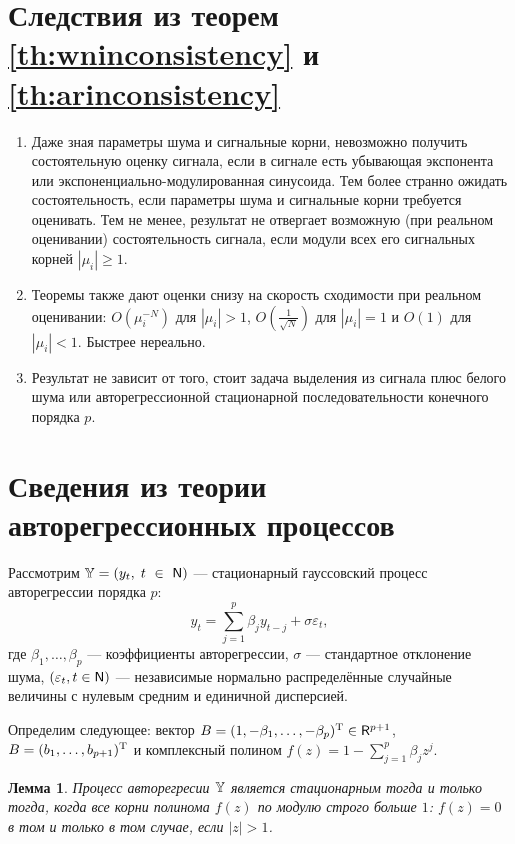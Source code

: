 \documentclass[12pt,a4paper]{article}
\newtheorem{lemma}{Лемма}
\begin{document}
\section{Следствия из теорем \ref{th:wninconsistency} и \ref{th:arinconsistency}}
\begin{enumerate}
	\item Даже зная параметры шума и сигнальные корни, невозможно получить состоятельную оценку сигнала, если в сигнале есть убывающая экспонента или экспоненциально-модулированная синусоида. Тем более странно ожидать состоятельность, если параметры шума и сигнальные корни требуется оценивать. Тем не менее, результат не отвергает возможную (при реальном оценивании) состоятельность сигнала, если модули всех его сигнальных корней $|\mu_i| \ge 1$.
	
	\item Теоремы также дают оценки снизу на скорость сходимости при реальном оценивании: $O(\mu_i^{-N})$ для $|\mu_i| > 1$, $O(\frac{1}{\sqrt{N}})$ для $|\mu_i| = 1$ и $O(1)$ для $|\mu_i| < 1$. Быстрее нереально.
	
	\item Результат не зависит от того, стоит задача выделения из сигнала плюс белого шума или авторегрессионной стационарной последовательности конечного порядка $p$. \cite{ZhigljavskyGolyandinaGryaznov2016}
\end{enumerate}

\section{Сведения из теории авторегрессионных процессов}

Рассмотрим $\mathbb{Y} = (y_t, \; t~\in~\mathsf{N})$ --- стационарный гауссовский процесс авторегрессии  порядка $p$:
\begin{equation} \label{def:arp}
y_t = \sum_{j = 1}^p \beta_j y_{t - j} + \sigma \varepsilon_t,
\end{equation}
где $\beta_1, \ldots, \beta_p$ --- коэффициенты авторегрессии, $\sigma$ --- стандартное отклонение шума, $(\varepsilon_t, t \in \mathsf{N})$ --- независимые нормально распределённые случайные величины с нулевым средним и единичной дисперсией.

Определим следующее: вектор $B = (1, -\beta_1, \ldots, -\beta_p)^{\mathrm{T}} \in \mathsf{R}^{p+1}$, $B = (b_1, \ldots, b_{p+1})^{\mathrm{T}}$ и комплексный полином $f(z) = 1 - \sum_{j=1}^p \beta_j z^j$.

\begin{lemma}\label{th:stat}
	Процесс авторегресии $\mathbb{Y}$ является стационарным тогда и только тогда, когда все корни полинома $f(z)$ по модулю строго больше $1$: $f(z) = 0$ в том и только в том случае, если $|z| > 1$.
\end{lemma}
\end{document}
